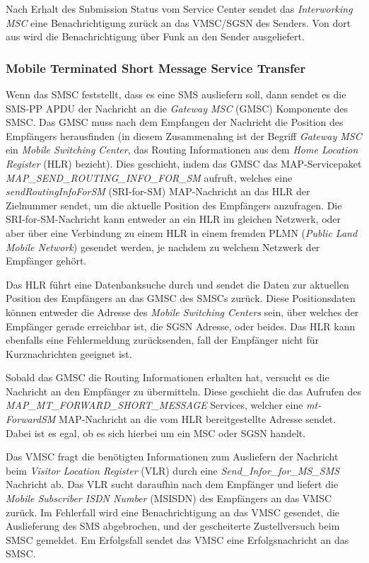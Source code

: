 \documentclass[german,12pt,a4paper]{article}
\begin{document}
Nach Erhalt des Submission Status vom Service Center sendet das \textit{Interworking MSC} eine Benachrichtigung
zurück an das VMSC/SGSN des Senders. Von dort aus wird die Benachrichtigung über Funk an den Sender
ausgeliefert.


\subsubsection{Mobile Terminated Short Message Service Transfer}
Wenn das SMSC feststellt, dass es eine SMS ausliefern soll, dann sendet es die SMS-PP APDU der Nachricht 
an die \textit{Gateway MSC} (GMSC) Komponente des SMSC. Das GMSC muss nach dem Empfangen der Nachricht die Position
des Empfängers herausfinden (in diesem Zusammenahng ist der Begriff \textit{Gateway MSC} ein \textit{Mobile Switching Center}, das Routing 
Informationen aus dem \textit{Home Location Register} (HLR) bezieht). Dies geschieht, indem das GMSC das MAP-Servicepaket 
\textit{MAP\_SEND\_ROUTING\_INFO\_FOR\_SM} aufruft, welches eine \textit{sendRoutingInfoForSM} (SRI-for-SM) 
MAP-Nachricht an das HLR der Zielnummer sendet, um die aktuelle Position des Empfängers anzufragen.
Die SRI-for-SM-Nachricht kann entweder an ein HLR im gleichen Netzwerk, oder aber über eine Verbindung zu
einem HLR in einem fremden PLMN (\textit{Public Land Mobile Network}) gesendet werden, je nachdem zu welchem 
Netzwerk der Empfänger gehört.

Das HLR führt eine Datenbanksuche durch und sendet die Daten zur aktuellen Position des Empfängers an das 
GMSC des SMSCs zurück. Diese Positionsdaten können entweder die Adresse des \textit{Mobile Switching Centers} sein, über welches der 
Empfänger gerade erreichbar ist, die SGSN Adresse, oder beides. Das HLR kann ebenfalls eine Fehlermeldung 
zurücksenden, fall der Empfänger nicht für Kurznachrichten geeignet ist.

Sobald das GMSC die Routing Informationen erhalten hat, versucht es die Nachricht an den Empfänger zu 
übermitteln. Diese geschieht die das Aufrufen des \textit{MAP\_MT\_\-FORWARD\_SHORT\_MESSAGE} Services, welcher eine
\textit{mt-ForwardSM} MAP-Nachricht an die vom HLR bereitgestellte Adresse sendet. Dabei ist es egal, ob es sich 
hierbei um ein MSC oder SGSN handelt.

Das VMSC fragt die benötigten Informationen zum Ausliefern der Nachricht beim \textit{Visitor Location Register}
(VLR) durch eine \textit{Send\_Infor\_for\_MS\_SMS} Nachricht ab. Das VLR sucht daraufhin nach dem Empfänger und
liefert die \textit{Mobile Subscriber ISDN Number} (MSISDN) des Empfängers an das VMSC zurück. Im Fehlerfall wird 
eine Benachrichtigung an das VMSC gesendet, die Auslieferung des SMS abgebrochen, und der gescheiterte 
Zustellversuch beim SMSC gemeldet. Em Erfolgsfall sendet das VMSC eine Erfolgsnachricht an das SMSC.
\end{document}
